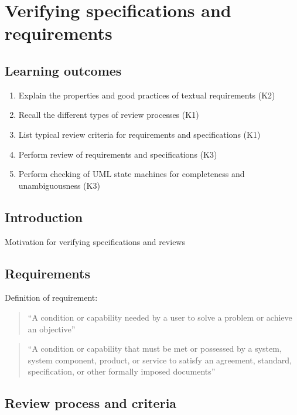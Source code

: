 \chapter{Verifying specifications and requirements}
\label{cha:specifications}

\section*{Learning outcomes}

\begin{enumerate}
    \item Explain the properties and good practices of textual requirements (K2)
    \item Recall the different types of review processes (K1)
    \item List typical review criteria for requirements and specifications (K1)
    \item Perform review of requirements and specifications (K3)
    \item Perform checking of UML state machines for completeness and unambiguousness (K3)
\end{enumerate}

\section{Introduction}

Motivation for verifying specifications and reviews


\section{Requirements}

Definition of requirement:

\begin{quote}
    ``A condition or capability needed by a user to solve a problem or achieve an objective'' \cite{ieee-24765}
\end{quote}

\begin{quote}
   ``A condition or capability that must be met or possessed by a system, system component, product, or service to satisfy an agreement, standard, specification, or other formally imposed documents'' \cite{ieee-24765}
    \end{quote}


\section{Review process and criteria}


